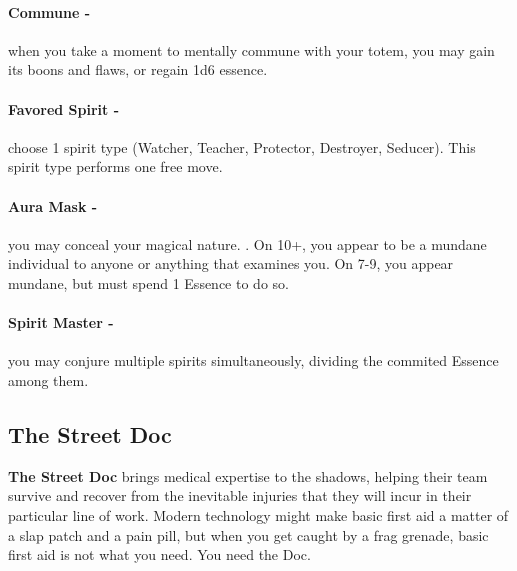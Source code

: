 \paragraph{Commune -} when you take a moment to mentally commune with your totem, you may gain its boons and flaws, or regain 1d6 essence.

\paragraph{Favored Spirit -} choose 1 spirit type (Watcher, Teacher, Protector, Destroyer, Seducer). This spirit type performs one free move.

\paragraph{Aura Mask -} you may conceal your magical nature. . On 10+, you appear to be a mundane individual to anyone or anything that examines you. On 7-9, you appear mundane, but must spend 1 Essence to do so.

\paragraph{Spirit Master -} you may conjure multiple spirits simultaneously, dividing the commited Essence among them.



\clearpage
\subsection{The Street Doc}
\textbf{The Street Doc} brings medical expertise to the shadows, helping their team survive and recover from the inevitable injuries that they will incur in their particular line of work. Modern technology might make basic first aid a matter of a slap patch and a pain pill, but when you get caught by a frag grenade, basic first aid is not what you need. You need the Doc.

